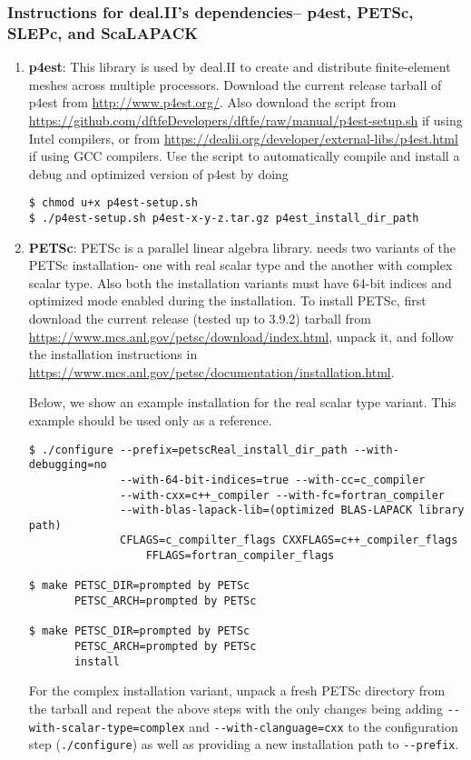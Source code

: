 \subsubsection{Instructions for deal.II's dependencies-- p4est, PETSc, SLEPc, and ScaLAPACK}
\begin{enumerate}
	\item   {\bf p4est}: This library is used by deal.II to create and distribute finite-element meshes across multiple processors. Download the current release tarball of p4est from \url{http://www.p4est.org/}. Also download the script from \url{https://github.com/dftfeDevelopers/dftfe/raw/manual/p4est-setup.sh} if using Intel compilers, or from \url{https://dealii.org/developer/external-libs/p4est.html} if using GCC compilers. Use the script to automatically compile and install a debug and optimized version of p4est by doing
\begin{verbatim}
$ chmod u+x p4est-setup.sh
$ ./p4est-setup.sh p4est-x-y-z.tar.gz p4est_install_dir_path
\end{verbatim}

	\item {\bf PETSc}: PETSc is a parallel linear algebra library. \dftfe{} needs two variants of the PETSc installation- one with real scalar type and the another with complex scalar type. Also both the installation variants must have 64-bit indices and optimized mode enabled during the installation. To install PETSc, first download the current release (tested up to 3.9.2) tarball from \url{https://www.mcs.anl.gov/petsc/download/index.html}, unpack it, and follow the installation instructions in \url{https://www.mcs.anl.gov/petsc/documentation/installation.html}. 
	
Below, we show an example installation for the real scalar type variant. 
This example should be used only as a reference.
\begin{verbatim}
$ ./configure --prefix=petscReal_install_dir_path --with-debugging=no 
              --with-64-bit-indices=true --with-cc=c_compiler
              --with-cxx=c++_compiler --with-fc=fortran_compiler
              --with-blas-lapack-lib=(optimized BLAS-LAPACK library path) 
              CFLAGS=c_compilter_flags CXXFLAGS=c++_compiler_flags
	              FFLAGS=fortran_compiler_flags

$ make PETSC_DIR=prompted by PETSc 
       PETSC_ARCH=prompted by PETSc

$ make PETSC_DIR=prompted by PETSc 
       PETSC_ARCH=prompted by PETSc
       install
\end{verbatim}
For the complex installation variant, unpack a fresh PETSc directory from the tarball and repeat the above steps with the only changes being adding  \verb|--with-scalar-type=complex| and \verb|--with-clanguage=cxx| to the configuration step (\verb|./configure|) as well as providing a new installation path to \verb|--prefix|.


\end{enumerate}
